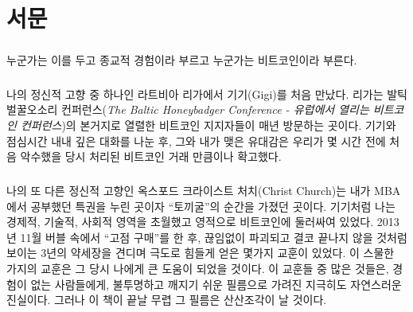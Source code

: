 \chapter*{서문}

\paragraph{}
누군가는 이를 두고 종교적 경험이라 부르고  
누군가는 비트코인이라 부른다.

\paragraph{}
나의 정신적 고향 중 하나인 라트비아 리가에서 기기(Gigi)를 처음 만났다. 리가는 발틱 벌꿀오소리 컨퍼런스(\textit{The Baltic Honeybadger Conference - 유럽에서 열리는 비트코인 컨퍼런스})의 본거지로 열렬한 비트코인 지지자들이 매년 방문하는 곳이다. 
기기와 점심시간 내내 깊은 대화를 나눈 후, 그와 내가 맺은 유대감은 우리가 몇 시간 전에 처음 악수했을 당시 처리된 비트코인 거래 만큼이나 확고했다. 


\paragraph{}
나의 또 다른 정신적 고향인 옥스포드 크라이스트 처치(Christ Church)는 내가 MBA에서 공부했던 특권을 누린 곳이자 \enquote{토끼굴}의 순간을 가졌던 곳이다.
기기처럼 나는 경제적, 기술적, 사회적 영역을 초월했고 영적으로 비트코인에 둘러싸여 있었다. 
2013년 11월 버블 속에서 \enquote{고점 구매}를 한 후, 끊임없이 파괴되고 결코 끝나지 않을 것처럼 보이는 3년의 약세장을 견디며 극도로 힘들게 얻은 몇가지 교훈이 있었다.
이 스물한 가지의 교훈은 그 당시 나에게 큰 도움이 되었을 것이다. 
이 교훈들 중 많은 것들은, 경험이 없는 사람들에게, 불투명하고 깨지기 쉬운 필름으로 가려진 지극히도 자연스러운 진실이다.  그러나 이 책이 끝날 무렵 그 필름은 산산조각이 날 것이다.


